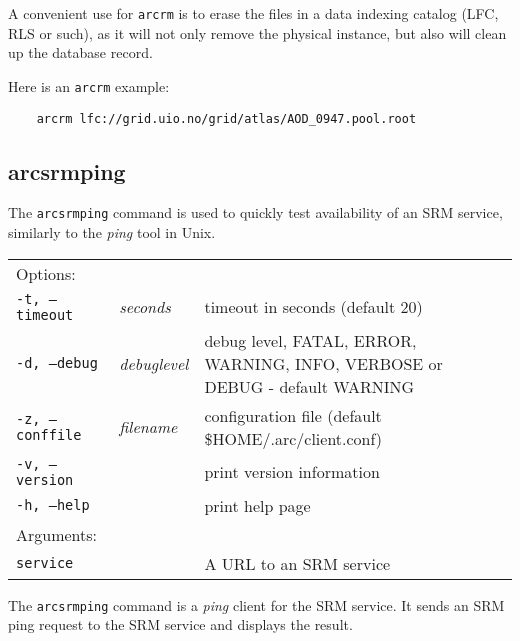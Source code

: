 \begin{framed}
   A convenient use for \texttt{arcrm} is to erase the files in a data
   indexing catalog (LFC, RLS or such), as it will not only remove the
   physical instance, but also will clean up the database record.
\end{framed}

Here is an \texttt{arcrm} example:

\begin{verbatim}
    arcrm lfc://grid.uio.no/grid/atlas/AOD_0947.pool.root
\end{verbatim}

\subsection{arcsrmping}\label{sec:arcsrmping}

The \texttt{arcsrmping}
command is used to quickly test availability of an SRM service, similarly to the \textit{ping} tool in Unix.
\hspace*{0.5cm}
\begin{shaded}
\end{shaded}
\begin{longtable}{llp{8cm}}
    Options:&&\\
   \texttt{-t, --timeout}&\textit{seconds}&timeout in seconds (default 20)\\
   \texttt{-d, --debug}&\textit{debuglevel}&debug level, FATAL, ERROR, WARNING, INFO, VERBOSE or DEBUG - default WARNING\\
   \texttt{-z, --conffile}&\textit{filename}& configuration file (default {\$}HOME/.arc/client.conf)\\
   \texttt{-v, --version}&&print version information\\
   \texttt{-h, --help}&&print help page\\
    Arguments:&&\\
   \texttt{service} && A URL to an SRM service\\
\end{longtable}

The \texttt{arcsrmping} command is a \textit{ping} client for the SRM service. It sends an SRM ping request to the SRM service and displays the result.


